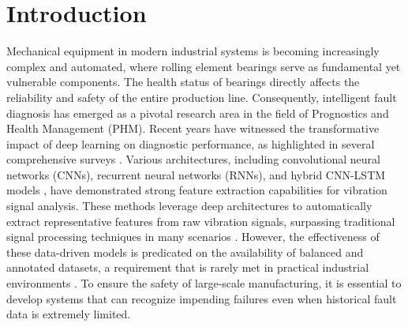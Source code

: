\begin{abstract}
Rolling element bearings are critical components in industrial machinery, and their failure can lead to catastrophic system breakdowns. While deep learning has significantly advanced fault diagnosis, the performance of these models is often hampered by the class imbalance problem, where fault samples are scarce compared to normal data. To address this challenge, this paper proposes a novel framework termed CAC-CycleGAN-WGP for imbalanced bearing fault diagnosis. The methodological core involves a CycleGAN architecture that transforms normal vibration signals into realistic fault signals, integrated with a Conditional Auxiliary Classifier (CAC) to accurately capture the marginal probability distributions of various fault categories. To ensure training stability and suppress mode collapse, we incorporate Wasserstein distance with a Gradient Penalty (WGP). Furthermore, a quality assessment method based on Stacked Autoencoders (SAE) is developed to evaluate the fidelity of the generated samples. Extensive experiments are conducted on two imbalanced bearing datasets: the Case Western Reserve University (CWRU) dataset and a custom laboratory dataset. Comparative results against state-of-the-art methods, including SMOTE, GAN, WGAN, ACGAN, and CAC-CycleGAN-WGP, demonstrate that the proposed CAC-CycleGAN-WGP significantly improves diagnostic accuracy and robustness under severe data imbalance, providing a viable solution for real-world industrial health monitoring.
\end{abstract}

\section{Introduction}
\label{sec:intro}

Mechanical equipment in modern industrial systems is becoming increasingly complex and automated, where rolling element bearings serve as fundamental yet vulnerable components. The health status of bearings directly affects the reliability and safety of the entire production line. Consequently, intelligent fault diagnosis has emerged as a pivotal research area in the field of Prognostics and Health Management (PHM). Recent years have witnessed the transformative impact of deep learning on diagnostic performance, as highlighted in several comprehensive surveys \cite{8, Lei2020, 9}. Various architectures, including convolutional neural networks (CNNs), recurrent neural networks (RNNs), and hybrid CNN-LSTM models \cite{10}, have demonstrated strong feature extraction capabilities for vibration signal analysis. These methods leverage deep architectures to automatically extract representative features from raw vibration signals, surpassing traditional signal processing techniques in many scenarios \cite{32}. However, the effectiveness of these data-driven models is predicated on the availability of balanced and annotated datasets, a requirement that is rarely met in practical industrial environments \cite{40, 41}. To ensure the safety of large-scale manufacturing, it is essential to develop systems that can recognize impending failures even when historical fault data is extremely limited.

